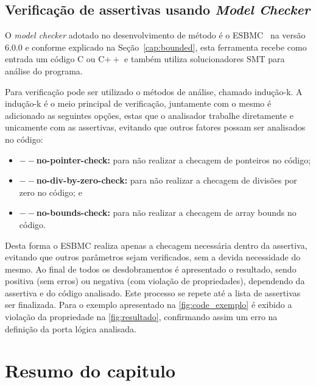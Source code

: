 \subsection{Verificação de assertivas usando \textit{Model Checker}}

\par
O \textit{model checker} adotado no desenvolvimento de método é o ESBMC~\cite{cordeiro2012smt} na versão $6.0.0$ e conforme explicado na Seção~\ref{cap:bounded}, esta ferramenta recebe como entrada um código C ou C$++$ e também utiliza solucionadores SMT para análise do programa. 

\par
Para verificação pode ser utilizado o métodos de análise, chamado indução-k. A indução-k é o meio principal de verificação, juntamente com o mesmo é adicionado as seguintes opções, estas que o analisador trabalhe diretamente e unicamente com as assertivas, evitando que outros fatores possam ser analisados no código: 
\begin{itemize} 
    \item \textbf{$--$no-pointer-check:} para não realizar a checagem de ponteiros no código; 
    \item \textbf{$--$no-div-by-zero-check:} para não realizar a checagem de divisões por zero no código; e 
    \item \textbf{$--$no-bounds-check:} para não realizar a checagem de array bounds no código. 
\end{itemize} 

\par
Desta forma o ESBMC realiza apenas a checagem necessária dentro da assertiva, evitando que outros parâmetros sejam verificados, sem a devida necessidade do mesmo. Ao final de todos os desdobramentos é apresentado o resultado, sendo positiva (sem erros) ou negativa (com violação de propriedades), dependendo da assertiva e do código analisado. Este processo se repete até a lista de assertivas ser finalizada. Para o exemplo apresentado na \autoref{fig:code_exemplo} é exibido a violação da propriedade na \autoref{fig:resultado}, confirmando assim um erro na definição da porta lógica analisada.

\section{Resumo do capitulo}
